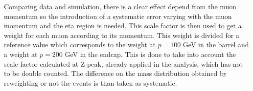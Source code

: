 Comparing data and simulation, there is a clear effect depend from the muon momentum so the introduction of a systematic error varying with the muon momentum and the eta region is needed. This scale factor is then used to get a weight for each muon according to its momentum. This weight is divided for a reference value which corresponds to the weight at $p = 100$ GeV in the barrel and a weight at $p = 200$ GeV in the endcap. This is done to take into account the scale factor calculated at Z peak, already applied in the analysis, which has not to be double counted. The difference on the mass distribution obtained by reweighting or not the events is than taken as systematic.  


